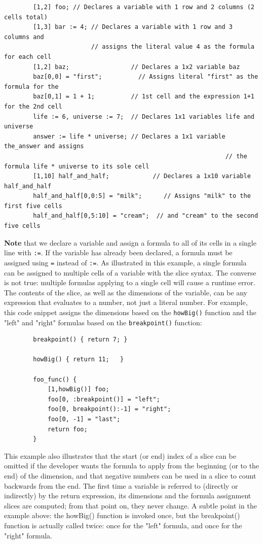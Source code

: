 	\begin{lstlisting}
		[1,2] foo; // Declares a variable with 1 row and 2 columns (2 cells total)
		[1,3] bar := 4; // Declares a variable with 1 row and 3 columns and
		                // assigns the literal value 4 as the formula for each cell
		[1,2] baz;                 // Declares a 1x2 variable baz
		baz[0,0] = "first";   		 // Assigns literal "first" as the formula for the
		baz[0,1] = 1 + 1;          // 1st cell and the expression 1+1 for the 2nd cell
		life := 6, universe := 7;  // Declares 1x1 variables life and universe
		answer := life * universe; // Declares a 1x1 variable the_answer and assigns
															 // the formula life * universe to its sole cell
		[1,10] half_and_half;			 // Declares a 1x10 variable half_and_half
		half_and_half[0,0:5] = "milk";		// Assigns "milk" to the first five cells
		half_and_half[0,5:10] = "cream";  // and "cream" to the second five cells
	\end{lstlisting}

	\medskip \noindent
	\textbf{Note} that we declare a variable and assign a formula to all of its cells in a single line with \texttt{:=}. If the variable has already been declared, a formula must be assigned using \texttt{=} instead of \texttt{:=}. As illustrated in this example, a single formula can be assigned to multiple cells of a variable with the slice syntax. The converse is not true: multiple formulas applying to a single cell will cause a runtime error. The contents of the slice, as well as the dimensions of the variable, can be any expression that evaluates to a number, not just a literal number. For example, this code snippet assigns the dimensions based on the \texttt{howBig()} function and the "left" and "right" formulas based on the \texttt{breakpoint()} function:

	\begin{lstlisting}
		breakpoint() { return 7; }

		howBig() { return 11;	}

		foo_func() {
			[1,howBig()] foo;
			foo[0, :breakpoint()] = "left";
			foo[0, breakpoint():-1] = "right";
			foo[0, -1] = "last";
			return foo;
		}
	\end{lstlisting}

	\medskip \noindent
	This example also illustrates that the start (or end) index of a slice can be omitted if the developer wants the formula to apply from the beginning (or to the end) of the dimension, and that negative numbers can be used in a slice to count backwards from the end. The first time a variable is referred to (directly or indirectly) by the return expression, its dimensions and the formula assignment slices are computed; from that point on, they never change. A subtle point in the example above: the howBig() function is invoked once, but the breakpoint() function is actually called twice: once for the "left" formula, and once for the "right" formula.

